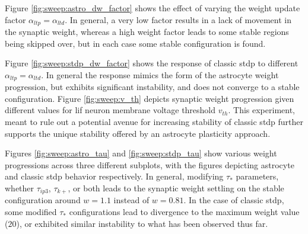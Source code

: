 

Figure \ref{fig:sweep:astro_dw_factor} shows the effect of varying the weight
update factor $\alpha_{ltp}=\alpha_{ltd}$. In general, a very low factor results
in a lack of movement in the synaptic weight, whereas a high weight factor leads
to some stable regions being skipped over, but in each case some stable
configuration is found.



Figure \ref{fig:sweep:stdp_dw_factor} shows the response of classic \gls{stdp} to
different $\alpha_{ltp}=\alpha_{ltd}$. In general the response mimics the form
of the astrocyte weight progression, but exhibits significant instability, and
does not converge to a stable configuration. Figure \ref{fig:sweep:v_th} depicts
synaptic weight progression given different values for \gls{lif} neuron membrane
voltage threshold $v_{th}$. This experiment, meant to rule out a potential
avenue for increasing stability of classic \gls{stdp} further supports the unique
stability offered by an astrocyte plasticity approach.


Figures \ref{fig:sweep:astro_tau} and \ref{fig:sweep:stdp_tau} show various
weight progressions across three different subplots, with the figures
depicting astrocyte and classic \gls{stdp} behavior respectively. In general,
modifying $\tau_*$ parameters, whether $\tau_{ip3}$, $\tau_{k+}$, or both leads
to the synaptic weight settling on the stable configuration around $w=1.1$
instead of $w=0.81$. In the case of classic \gls{stdp}, some modified $\tau_*$
configurations lead to divergence to the maximum weight value ($20$), or
exhibited similar instability to what has been observed thus far.

